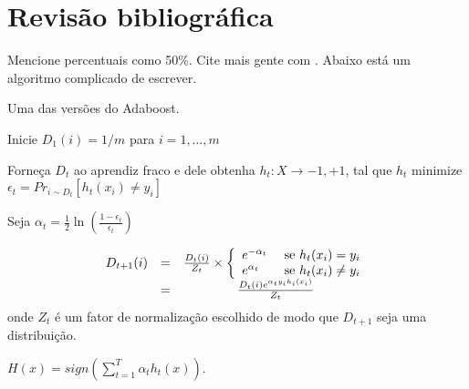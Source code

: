 \pagestyle{fancy}

\chapter{Revisão bibliográfica}
\label{cap2}

Mencione percentuais como 50\%. Cite mais gente com \cite{Otsu1979}.
Abaixo está um algoritmo complicado de escrever.

\begin{algorithm}
\caption{Uma das versões do Adaboost.}

Inicie $D_1(i) = 1/m$ para $i = 1, \ldots, m$\;

 {
	Forneça $D_t$ ao aprendiz fraco e dele obtenha $h_t: X \rightarrow {-1, +1}$,
	tal que $h_t$ minimize $\epsilon_t = Pr_{i \sim D_t}[h_t(x_i) \neq y_i]$

	Seja $\alpha_t = \frac{1}{2} \ln(\frac{1 - \epsilon_t}{\epsilon_t})$

	 {
		\begin{equation}
			\begin{matrix}
				D_{t+1}(i) & = & \frac{D_t(i)}{Z_t} \times
				\left\{
					\begin{array}{l l}
						e^{-\alpha_t} & \text{ se } h_t(x_i) = y_i\\
						e^{\alpha_t} & \text{ se } h_t(x_i) \neq y_i\\
					\end{array}
				\right.\\
				& = & \frac{D_t(i) e^{\alpha_t y_i h_i(x_i)}}{Z_t}
			\end{matrix}
		\end{equation}
		onde $Z_t$ é um fator de normalização escolhido de modo que $D_{t+1}$ seja uma
		distribuição.
	}
}
\Return $H(x) = sign(\sum_{t=1}^{T} \alpha_t h_t(x))$.

\end{algorithm}
